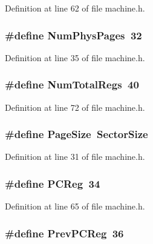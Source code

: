 Definition at line 62 of file machine.\+h.

\subsubsection[{Num\+Phys\+Pages}]{\setlength{\rightskip}{0pt plus 5cm}\#define Num\+Phys\+Pages~32}\label{machine_8h_a0b9f33667767389c6dbb4a83017ce7ed}


Definition at line 35 of file machine.\+h.

\subsubsection[{Num\+Total\+Regs}]{\setlength{\rightskip}{0pt plus 5cm}\#define Num\+Total\+Regs~40}\label{machine_8h_a3d05ab2fa1bfa8eb176488fe4119a464}


Definition at line 72 of file machine.\+h.

\subsubsection[{Page\+Size}]{\setlength{\rightskip}{0pt plus 5cm}\#define Page\+Size~{\bf Sector\+Size}}\label{machine_8h_a25fe6c9816d1f84cecd50a0503825bf2}


Definition at line 31 of file machine.\+h.

\subsubsection[{P\+C\+Reg}]{\setlength{\rightskip}{0pt plus 5cm}\#define P\+C\+Reg~34}\label{machine_8h_a7152c26c857a03695afc8c8b05f1197b}


Definition at line 65 of file machine.\+h.

\subsubsection[{Prev\+P\+C\+Reg}]{\setlength{\rightskip}{0pt plus 5cm}\#define Prev\+P\+C\+Reg~36}\label{machine_8h_aa24552328a05615e6067ce5a0ad0bbf3}


